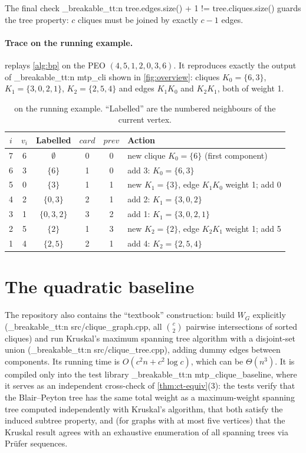 \documentclass[11pt,a4paper,oneside]{report}
\theoremstyle{plain}
\theoremstyle{definition}
\theoremstyle{remark}
\DeclareRobustCommand{\code}[1]{\mtp_breakable_tt:n {#1}}
\DeclareRobustCommand{\file}[1]{\mtp_breakable_tt:n {#1}}
\begin{document}
The final check \code{tree.edges.size() + 1 != tree.cliques.size()} guards the tree property:
\(c\) cliques must be joined by exactly \(c-1\) edges.

\paragraph{Trace on the running example.}  replays \cref{alg:bp} on the
PEO \((4,5,1,2,0,3,6)\). It reproduces exactly the output of \code{mtp_cli} shown in
\cref{fig:overview}: cliques \(K_0=\{6,3\}\), \(K_1=\{3,0,2,1\}\), \(K_2=\{2,5,4\}\) and edges
\(K_1K_0\) and \(K_2K_1\), both of weight 1.

\begin{table}[ht]
\centering\small
\caption[Blair--Peyton trace on the running example]{ on the running example.
``Labelled'' are the numbered neighbours of the current vertex.}\label{tab:bp-trace}
\begin{tabular}{@{}cccccl@{}}
\toprule
\(i\) & \(v_i\) & \textbf{Labelled} & \(\mathit{card}\) & \(\mathit{prev}\) & \textbf{Action}\\
\midrule
7 & 6 & \(\emptyset\) & 0 & 0 & new clique \(K_0=\{6\}\) (first component)\\
6 & 3 & \(\{6\}\) & 1 & 0 & add 3: \(K_0=\{6,3\}\)\\
5 & 0 & \(\{3\}\) & 1 & 1 & new \(K_1=\{3\}\), edge \(K_1K_0\) weight 1; add 0\\
4 & 2 & \(\{0,3\}\) & 2 & 1 & add 2: \(K_1=\{3,0,2\}\)\\
3 & 1 & \(\{0,3,2\}\) & 3 & 2 & add 1: \(K_1=\{3,0,2,1\}\)\\
2 & 5 & \(\{2\}\) & 1 & 3 & new \(K_2=\{2\}\), edge \(K_2K_1\) weight 1; add 5\\
1 & 4 & \(\{2,5\}\) & 2 & 1 & add 4: \(K_2=\{2,5,4\}\)\\
\bottomrule
\end{tabular}
\end{table}

\section{The quadratic baseline}\label{sec:baseline}
The repository also contains the ``textbook'' construction: build \(W_G\) explicitly
(\file{src/clique_graph.cpp}, all \(\binom{c}{2}\) pairwise intersections of sorted cliques)
and run Kruskal's maximum spanning tree algorithm with a disjoint-set union
(\file{src/clique_tree.cpp}), adding dummy edges between components. Its running time is
\(O(c^2 n + c^2\log c)\), which can be \(\Theta(n^3)\). It is compiled only into the test
library \code{mtp_clique_baseline}, where it serves as an independent cross-check of
\cref{thm:ct-equiv}(3): the tests verify that the Blair--Peyton tree has the same total weight
as a maximum-weight spanning tree computed independently with Kruskal's algorithm, that both
satisfy the induced subtree property, and (for graphs with at most five vertices) that the
Kruskal result agrees with an exhaustive enumeration of all spanning trees via Prüfer
sequences.
\end{document}
